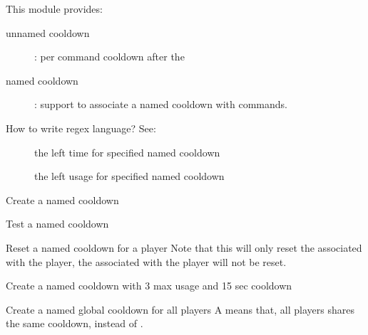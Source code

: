 \label{ch:command_cooldown}

This module provides:

\begin{description}
    \item [unnamed cooldown]: {per command cooldown after the }
    \item [named cooldown]: {support to associate a named cooldown with commands.}
\end{description}

\begin{tips}{How to write regex language?}
    See:~
\end{tips}

\begin{description}
    \item [] the left time for specified named cooldown
    \item [] the left usage for specified named cooldown
\end{description}


\begin{example}{Create a named cooldown}
\end{example}

\begin{example}{Test a named cooldown}
\end{example}

\begin{example}{Reset a named cooldown for a player}
    Note that this will only reset the  associated with the player, the  associated with the player will not be reset.\\
\end{example}

\begin{example}{Create a named cooldown with 3 max usage and 15 sec cooldown}
\end{example}

\begin{example}{Create a named global cooldown for all players}
    A  means that, all players shares the same cooldown, instead of .\\
\end{example}

